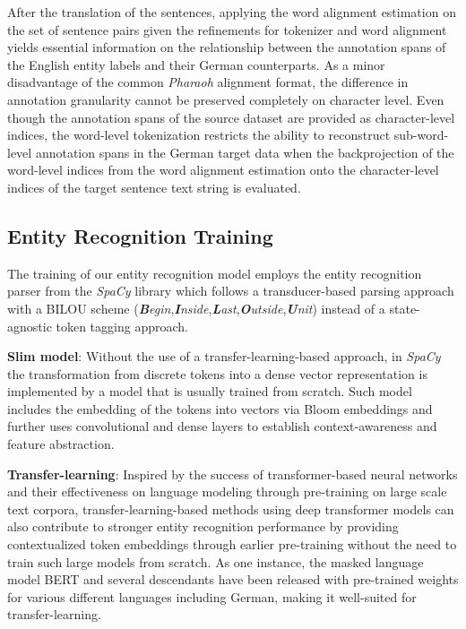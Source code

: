 \documentclass[runningheads]{llncs}
\begin{document}
After the translation of the sentences, applying the word alignment estimation on the set of sentence pairs given the refinements for tokenizer and word alignment yields essential information on the relationship between the annotation spans of the English entity labels and their German counterparts. As a minor disadvantage of the common \textit{Pharaoh} alignment format, the difference in annotation granularity cannot be preserved completely on character level. Even though the annotation spans of the source dataset are provided as character-level indices, the word-level tokenization restricts the ability to reconstruct sub-word-level annotation spans in the German target data when the backprojection of the word-level indices from the word alignment estimation onto the character-level indices of the target sentence text string is evaluated.

\subsection{Entity Recognition Training}

The training of our entity recognition model employs the entity recognition parser from the \textit{SpaCy} library which follows a transducer-based parsing approach with a BILOU scheme (\textit{\textbf{B}egin},\textit{\textbf{I}nside},\textit{\textbf{L}ast},\textit{\textbf{O}utside},\textit{\textbf{U}nit}) instead of a state-agnostic token tagging approach.

\textbf{Slim model}: Without the use of a transfer-learning-based approach, in \textit{SpaCy} the transformation from discrete tokens into a dense vector representation is implemented by a model that is usually trained from scratch. Such model includes the embedding of the tokens into vectors via Bloom embeddings and further uses convolutional and dense layers to establish context-awareness and feature abstraction.

\textbf{Transfer-learning}: Inspired by the success of transformer-based neural networks and their effectiveness on language modeling through pre-training on large scale text corpora, transfer-learning-based methods using deep transformer models can also contribute to stronger entity recognition performance by providing contextualized token embeddings through earlier pre-training without the need to train such large models from scratch. As one instance, the masked language model BERT and several descendants have been released with pre-trained weights for various different languages including German, making it well-suited for transfer-learning.
\end{document}
